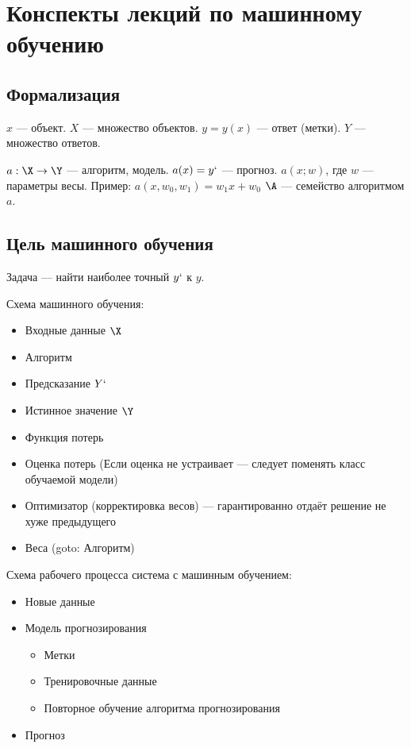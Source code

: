 \documentclass[14pt, a4paper]{article}
\begin{document}
    \section*{Конспекты лекций по машинному обучению}

    \subsection*{Формализация}

    $x$ --- объект.
    $X$ --- множество объектов.
    $y = y(x)$ --- ответ (метки).
    $Y$ --- множество ответов.

    $a: \X \rightarrow  \Y$ --- алгоритм, модель.
    $a(x) = y`$ --- прогноз.
    $a(x; w)$, где $w$ --- параметры весы. Пример: $a(x, w_0, w_1) = w_1 x + w_0$
    $\A$ --- семейство алгоритмом $a$.


    \subsection*{Цель машинного обучения}

    Задача --- найти наиболее точный $y`$ к $y$.

    Схема машинного обучения:
    \begin{itemize}
        \item Входные данные $\X$
        \item Алгоритм
        \item Предсказание $Y`$
        \item Истинное значение $\Y$
        \item Функция потерь
        \item Оценка потерь (Если оценка не устраивает --- следует поменять класс обучаемой модели)
        \item Оптимизатор (корректировка весов) --- гарантированно отдаёт решение не хуже предыдущего
        \item Веса (goto: Алгоритм)
    \end{itemize}

    Схема рабочего процесса система с машинным обучением:
    \begin{itemize}
        \item Новые данные
        \item Модель прогнозирования
        \begin{itemize}
            \item Метки
            \item Тренировочные данные
            \item Повторное обучение алгоритма прогнозирования
        \end{itemize}
        \item Прогноз
    \end{itemize}
\end{document}
